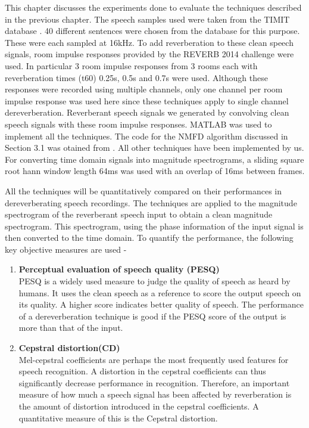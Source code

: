 \documentclass[12pt, a4paper, oneside]{book}
\begin{document}
\ifpdf
    \graphicspath{{Chapter3/Figs/Raster/}{Chapter3/Figs/PDF/}{Chapter3/Figs/}}
\else
    \graphicspath{{Chapter3/Figs/Vector/}{Chapter3/Figs/}}
\fi
This chapter discusses the experiments done to evaluate the techniques described in the previous chapter. The speech samples used were taken from the TIMIT database \cite{TIMIT}. 40 different sentences were chosen from the database for this purpose. These were each sampled at 16kHz. To add reverberation to these clean speech signals, room impulse responses provided by the REVERB 2014 challenge were used. In particular 3 room impulse responses from 3 rooms each with reverberation times (t60) 0.25s, 0.5s and 0.7s were used. Although these responses were recorded using multiple channels, only one channel per room impulse response was used here since these techniques apply to single channel dereverberation.   Reverberant speech signals we generated by convolving clean speech signals with these room impulse responses. MATLAB was used to implement all the techniques. The code for the NMFD algorithm discussed in Section 3.1 was otained from \cite{gamma}. All other techniques have been implemented by us. 
For converting time domain signals into magnitude spectrograms, a sliding square root hann window \cite{moham} length 64ms  was used with an overlap of 16ms between frames.

All the techniques will be quantitatively compared on their performances in dereverberating speech recordings. The techniques are applied to the magnitude spectrogram of the reverberant speech input to obtain a clean magnitude spectrogram. This spectrogram, using the phase information of the input signal is then converted to the time domain. 
To quantify the performance, the following key objective measures are used - 
\begin{enumerate}
\item \textbf{Perceptual evaluation of speech quality (PESQ)} \\
PESQ is a widely used measure to judge the quality of speech as heard by humans. It uses the clean speech as a reference to score the output speech on its quality. A higher score indicates better quality of speech. The performance of a dereverberation technique is good if the PESQ score of the output is more than that of the input.
\item \textbf{Cepstral distortion(CD)} \\
Mel-cepstral coefficients are perhaps the most frequently used features for speech recognition. A distortion in the cepstral coefficients can thus significantly decrease performance in recognition. Therefore, an important measure of how much a speech signal has been affected by reverberation is the amount of distortion introduced in the cepstral coefficients. A quantitative measure of this is the Cepstral distortion. 

\end{enumerate}
\end{document}
